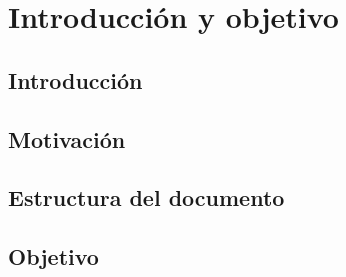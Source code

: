 \chapter{Introducción y objetivo}
\label{ch:introduccion}

\section{Introducción}

\section{Motivación}

\section{Estructura del documento}

\section{Objetivo}
